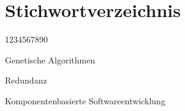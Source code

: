 %
%

\chapter{Stichwortverzeichnis} %
\begin{labeling}{1234567890}
        \item Genetische Algorithmen
        \item Redundanz
        \item Komponentenbasierte Softwareentwicklung
\end{labeling} 


